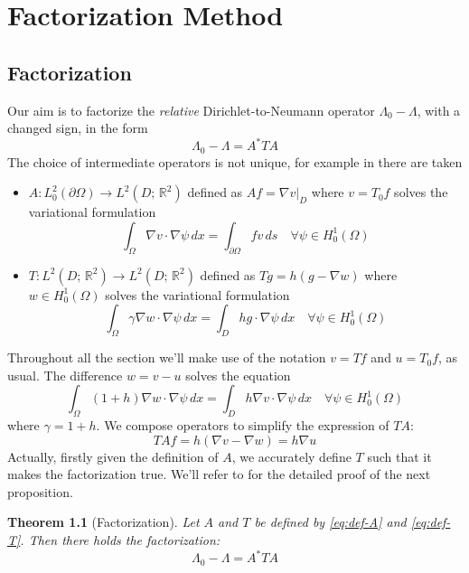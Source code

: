 \documentclass[10pt, a4paper, twoside, openright]{book}
\theoremstyle{definition}
\theoremstyle{plain}
\newtheorem{theorem}[subsection]{Theorem}
\theoremstyle{plain}
\theoremstyle{plain}
\theoremstyle{plain}
\theoremstyle{plain}
\theoremstyle{plain}
\theoremstyle{plain}
\theoremstyle{plain}
\begin{document}
\chapter{Factorization Method}
\label{ch:factorization}
\section{Factorization}
Our aim is to factorize the \textit{relative} Dirichlet-to-Neumann operator $\Lambda_0 - \Lambda$, with a changed sign, in the form
\begin{equation}
 \Lambda_0 - \Lambda = A^*TA
\end{equation}
The choice of intermediate operators is not unique, for example in \cite{kirsch:book} there are taken
\begin{itemize}
 \item $A:L^2_0(\partial \Omega) \to L^2(D;\,\mathbb{R}^2)$ defined as $Af = \nabla v|_D$ where $v = T_0f$ solves the variational formulation
 \begin{equation}
  \label{eq:def-A}
  \int_\Omega \nabla v\cdot \nabla \psi \, dx = \int_{\partial \Omega} fv\, ds\quad \forall\psi\in H^1_0(\Omega)
 \end{equation}
 \item $T:L^2(D;\,\mathbb{R}^2) \to L^2(D;\,\mathbb{R}^2)$ defined as $Tg = h(g - \nabla w)$ where $w\in H^1_0(\Omega)$ solves the variational formulation
 \begin{equation}
  \label{eq:def-T}
  \int_\Omega \gamma \nabla w\cdot \nabla \psi \, dx = \int_D hg\cdot\nabla\psi\, dx\quad \forall\psi\in H^1_0(\Omega)
 \end{equation}
\end{itemize}
Throughout all the section we'll make use of the notation $v=Tf$ and $u=T_0f$, as usual.
The difference $w = v - u$ solves the equation
\begin{equation}
 \int_\Omega(1+h)\nabla w\cdot\nabla\psi\, dx = \int_D h\nabla v \cdot \nabla \psi\, dx\quad \forall\psi\in H^1_0(\Omega)
\end{equation}
where $\gamma = 1 + h$.
We compose operators to simplify the expression of $TA$:
\begin{equation}
 TAf = h (\nabla v - \nabla w) = h \nabla u
\end{equation}
Actually, firstly given the definition of $A$, we accurately define $T$ such that it makes the factorization true.
We'll refer to \cite{kirsch:book} for the detailed proof of the next proposition.
\begin{theorem}[Factorization]
 Let $A$ and $T$ be defined by \ref{eq:def-A} and \ref{eq:def-T}. Then there holds the factorization:
\begin{equation}
 \Lambda_0 - \Lambda = A^*TA
\end{equation}
\end{theorem}
\end{document}
